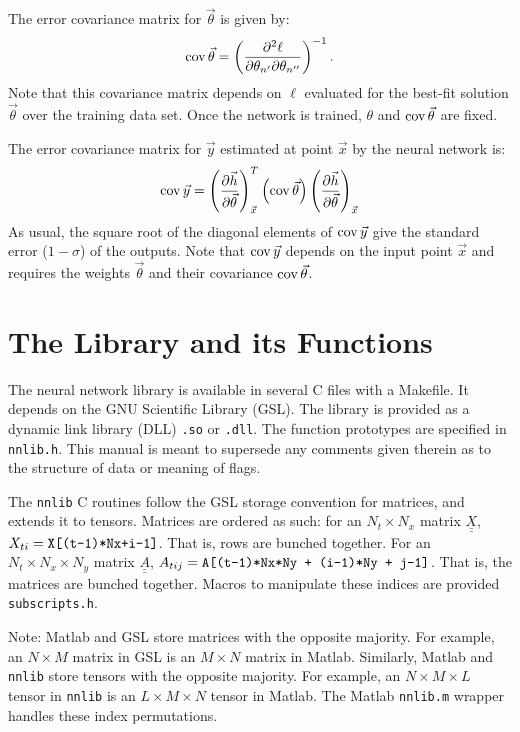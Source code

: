 \documentclass{article}    %
\newcommand{\dbul}[1]{\underline{\underline{#1}}}
\newcommand{\cov}{\mathop{{\rm cov}}}
\begin{document}
The error covariance matrix for $\vec{\theta}$ is given by:
\begin{equation}
\cov\vec\theta = \left( \frac{\partial^2\ell}{\partial \theta_{n'}\partial \theta_{n''}}  \right)^{-1}.
\end{equation}
Note that this covariance matrix depends on $\ell$ evaluated for the
best-fit solution $\vec\theta$ over the training data set. Once the
network is trained, $\theta$ and $\cov\vec\theta$ are fixed.

The error covariance matrix for $\vec{y}$ estimated at point $\vec{x}$
by the neural network is:
\begin{equation}
\cov{\vec{y}} = \left(\frac{\partial\vec{h}}{\partial \vec{\theta}}\right)_{\vec{x}}^{T}\left(\cov{\vec\theta}\right)\left(\frac{\partial\vec{h}}{\partial \vec{\theta}}\right)_{\vec{x}}
\end{equation}
As usual, the square root of the diagonal elements of $\cov{\vec{y}}$
give the standard error ($1-\sigma$) of the outputs. Note that
$\cov{\vec{y}}$ depends on the input point $\vec{x}$ and requires the
weights $\vec\theta$ and their covariance $\cov\vec\theta$.

\section{The Library and its Functions}

The neural network library is available in several C files with a
Makefile. It depends on the GNU Scientific Library (GSL). The library
is provided as a dynamic link library (DLL) \verb|.so| or \verb|.dll|.
The function prototypes are specified in \verb|nnlib.h|. This manual
is meant to supersede any comments given therein as to the structure
of data or meaning of flags.

The \verb|nnlib| C routines follow the GSL storage convention for
matrices, and extends it to tensors. Matrices are ordered as such: for
an $N_t \times N_x$ matrix $\dbul{X}$, $X_{ti} =
\verb|X[(t-1)*Nx+i-1]|$. That is, rows are bunched together. For an
$N_t \times N_x \times N_y$ matrix $\dbul{A}$, $A_{tij} =
\verb|A[(t-1)*Nx*Ny + (i-1)*Ny + j-1]|$. That is, the matrices are
bunched together. Macros to manipulate these indices are provided
\verb|subscripts.h|.

Note: Matlab and GSL store matrices with the opposite majority. For
example, an $N\times M$ matrix in GSL is an $M\times N$ matrix in
Matlab.  Similarly, Matlab and \verb|nnlib| store tensors with the
opposite majority. For example, an $N\times M \times L$ tensor in
\verb|nnlib| is an $L \times M\times N$ tensor in Matlab.  The Matlab
\verb|nnlib.m| wrapper handles these index permutations.
\end{document}
